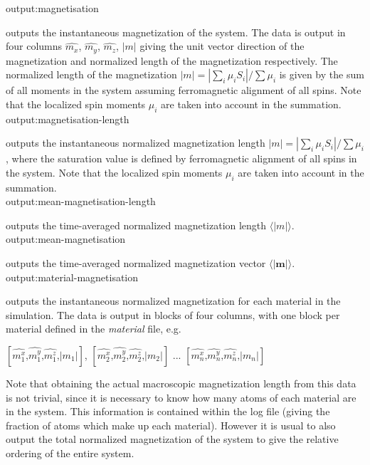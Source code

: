 {\zicf output:magnetisation} outputs the
instantaneous magnetization of the system. The data is output in four columns $\hat{m_x}$,
$\hat{m_y}$, $\hat{m_z}$, $|m|$ giving the unit vector direction of the magnetization and
normalized length of the magnetization respectively. The normalized length of the magnetization
 $|m| = |\sum_i \mu_i S_i| / \sum \mu_i$ is given by the sum of all moments in the system
 assuming ferromagnetic alignment of all spins. Note that the localized spin moments $\mu_i$
 are taken into account in the summation.\\

{\zicf output:magnetisation-length}
outputs the instantaneous normalized magnetization length $|m| = |\sum_i \mu_i S_i| / \sum \mu_i$,
where the saturation value is defined by ferromagnetic alignment of all spins in the system. Note
that the localized spin moments $\mu_i$ are taken into account in the summation.\\

{\zicf output:mean-magnetisation-length}
outputs the time-averaged normalized magnetization length $\langle|m|\rangle$.\\

{\zicf output:mean-magnetisation}
outputs the time-averaged normalized magnetization vector $\langle|\mathbf{m}|\rangle$.\\

{\zicf output:material-magnetisation}
outputs the instantaneous normalized magnetization for each material in the simulation.
The data is output in blocks of four columns, with one block per material defined in
the \textit{material} file, e.g.

\begin{center}
$\left[ \hat{m_1^x} \textrm{,} \hat{m_1^y} \textrm{,} \hat{m_1^z} \textrm{,} |m_1| \right]$,
$\left[ \hat{m_2^x} \textrm{,} \hat{m_2^y} \textrm{,} \hat{m_2^z} \textrm{,} |m_2| \right]$ ...
$\left[ \hat{m_n^x} \textrm{,} \hat{m_n^y} \textrm{,} \hat{m_n^z} \textrm{,} |m_n| \right]$
\end{center}

Note that obtaining the actual macroscopic magnetization length from this data is not trivial,
 since it is necessary to know how many atoms of each material are in the system. This
 information is contained within the log file (giving the fraction of atoms which make up
 each material). However it is usual to also output the total normalized magnetization of
 the system to give the relative ordering of the entire system.\\

